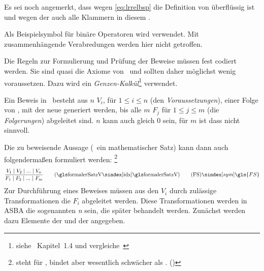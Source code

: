 Es sei noch angemerkt, dass wegen \eqref{eq:lrrelbsp} die Definition von \symqt{$\metarep$}  überflüssig ist und wegen der  auch alle Klammern in diesem \sectionname.

Als Beispielsymbol für binäre Operatoren wird \symqt{$\opbsp$} verwendet.
Mit \symqt{$\opbsp$} zusammenhängende Verabredungen werden hier nicht getroffen.

Die Regeln zur Formulierung und Prüfung der Beweise müssen fest codiert werden.
Sie sind quasi die Axiome von \ASBA\ und sollten daher möglichst wenig voraussetzen.
Dazu wird ein \emph{Genzen-Kalkül}\footnote{%
	siehe~\cite{bib:Rautenberg} Kapitel~1.4 und vergleiche~\cite{bib:Schlussregel,bib:NatuerlichesSchliessen}%
} verwendet.

Ein Beweis in \ASBA\ besteht aus $n$  $V_i$, für $1 \leq i \leq n$ (den \emph{Voraussetzungen}), einer Folge von , mit der neue  generiert werden, bis alle $m$  $F_j$ für $1 \leq j \leq m$ (die \emph{Folgerungen}) abgeleitet sind. $n$ kann auch gleich $0$ sein, für $m$ ist dass nicht sinnvoll.

Die zu beweisende Aussage (\textzB\ ein mathematischer Satz) kann dann auch folgendermaßen formuliert werden:%
\footnote{%
	\symqt{$\srand$} steht für , bindet aber wesentlich schwächer als . ()
}
\[
\frac{V_1 \srand V_2 \srand ... \srand V_n}{F_1 \srand F_2 \srand ... \srand F_m}
\qquad \text{(\glsIdx{formalerSatzV})}
\tag{\tagFS} \sym{\gls{FS}} \label{def:formalerSatz}
\]
Zur Durchführung eines Beweises müssen aus den $V_i$ durch zulässige Transformationen die $F_i$ abgeleitet werden. Diese Transformationen werden in ASBA die sogenannten \emph{n} sein, die später behandelt werden.
Zunächst werden dazu Elemente der \emph{} und der \emph{} angegeben.

